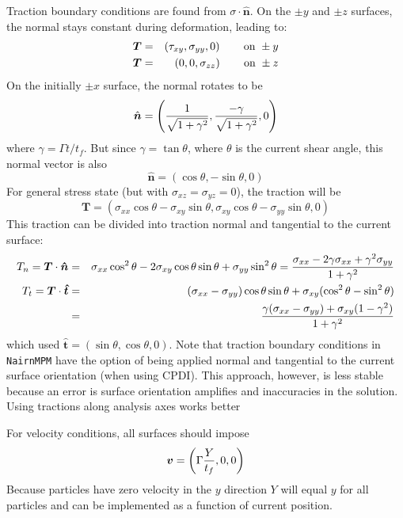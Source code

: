 \documentclass[11pt]{book}
\renewcommand{\vec}[1]{\boldsymbol{#1}}
\newcommand{\tens}[1]{\boldsymbol{\mathsf{#1}}}
\begin{document}
Traction boundary conditions are found from $\tens\sigma\cdot\hat{\vec n}$. On the $\pm y$ and $\pm z$ surfaces, the normal stays constant during deformation, leading to:
\begin{eqnarray}
    \vec T & = & \left(\tau_{xy}, \sigma_{yy},0\right)  \qquad {\rm on\ }\pm y\\
    \vec T & = & \left(0,0,\sigma_{zz}\right)  \qquad {\rm on\ }\pm z\\
\end{eqnarray}
On the initially $\pm x$ surface, the normal rotates to be
\begin{equation}
     \hat{\vec n} = \left( {1\over \sqrt{1+\gamma^2}}, {-\gamma\over \sqrt{1+\gamma^2}},0\right)
\end{equation}
where $\gamma = \Gamma t/t_f$. But since $\gamma = \tan\theta$, where $\theta$ is the current shear angle, this normal vector is also
\begin{equation}
     \hat{\vec n} = \left( \cos\theta, -\sin\theta,0\right)
\end{equation}
For general stress state (but with $\sigma_{xz}=\sigma_{yz}=0$), the traction will be
\begin{equation}
     \vec T = \left(\sigma_{xx}\cos\theta - \sigma_{xy}\sin\theta, \sigma_{xy}\cos\theta - \sigma_{yy}\sin\theta,0\right)
\end{equation}
This traction can be divided into traction normal and tangential to the current surface:
\begin{eqnarray}
     T_n = \vec T\cdot\vec{\hat n} & = & \sigma_{xx}\cos^2\theta -2\sigma_{xy}\cos\theta\sin\theta + \sigma_{yy}\sin^2\theta
                     = { \sigma_{xx} - 2\gamma\sigma_{xx} + \gamma^2\sigma_{yy}\over 1+\gamma^2 } \\
     T_t = \vec T\cdot\vec{\hat t} & = & (\sigma_{xx}-\sigma_{yy})\cos\theta\sin\theta + \sigma_{xy}(\cos^2\theta -\sin^2\theta) \\
        & = &  { \gamma(\sigma_{xx}-\sigma_{yy}) + \sigma_{xy}(1 -\gamma^2) \over 1+ \gamma^2}
\end{eqnarray}
which used $\vec{\hat t} = (\sin\theta,\cos\theta,0)$. Note that traction boundary conditions in {\tt NairnMPM} have the option of being applied normal and tangential to the current surface orientation (when using CPDI). This approach, however, is less stable because an error is surface orientation amplifies and inaccuracies in the solution. Using tractions along analysis axes works better

For velocity conditions, all surfaces should impose
\begin{equation}
    \vec v = \left(\Gamma{Y\over t_f},0,0\right)
\end{equation}
Because particles have zero velocity in the $y$ direction $Y$ will equal $y$ for all particles and can be implemented as a function of current position.
\end{document}
